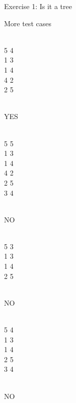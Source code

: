 \documentclass[handout]{beamer}
\begin{document}
\begin{frame}{Exercise 1: Is it a tree}

  \begin{exampleblock}{More test cases}
    \begin{minipage}[t]{0.225\linewidth}
    \\5 4\\1 3\\1 4\\4 2\\2 5
    
    \medskip
    \\YES
    \end{minipage}
    \begin{minipage}[t]{0.225\linewidth}
    \\5 5\\1 3\\1 4\\4 2\\2 5\\3 4
    
    \medskip
    \\NO
    \end{minipage}
    \begin{minipage}[t]{0.225\linewidth}
    \\5 3\\1 3\\1 4\\2 5
    
    \medskip
    \\NO
    \end{minipage}
    \begin{minipage}[t]{0.225\linewidth}
    \\5 4\\1 3\\1 4\\2 5\\3 4
    
    \medskip
    \\NO
    \end{minipage}
  \end{exampleblock}
\end{frame}
\end{document}
